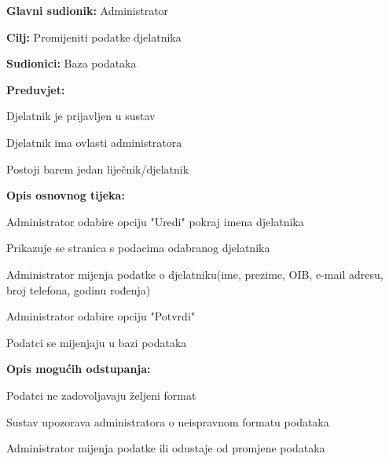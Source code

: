 				\noindent {}
				\begin{packed_item}
					
					\item \textbf{Glavni sudionik: }Administrator
					\item  \textbf{Cilj: }Promijeniti podatke djelatnika
					\item  \textbf{Sudionici: }Baza podataka
					\item  \textbf{Preduvjet: }
					\item[] \begin{packed_enum}
						
						\item[-] Djelatnik je prijavljen u sustav
						\item[-] Djelatnik ima ovlasti administratora
						\item[-] Postoji barem jedan liječnik/djelatnik
					\end{packed_enum}
					\item  \textbf{Opis osnovnog tijeka: }
					
					\item[] \begin{packed_enum}
						\item Administrator odabire opciju "Uredi" pokraj imena djelatnika
						\item Prikazuje se stranica s podacima odabranog djelatnika
						\item Administrator mijenja podatke o djelatniku(ime, prezime, OIB, e-mail adresu, broj telefona, godinu rođenja)
						\item Administrator odabire opciju "Potvrdi"
						\item Podatci se mijenjaju u bazi podataka
					\end{packed_enum}
					
					\item  \textbf{Opis mogućih odstupanja:}
					
					\item[] \begin{packed_item}
						
						\item[3.a] Podatci ne zadovoljavaju željeni format
						\item[] \begin{packed_enum}
							\item Sustav upozorava administratora o neispravnom formatu podataka
							\item Administrator mijenja podatke ili odustaje od promjene podataka							
						\end{packed_enum}
						

\end{packed_item}
\end{packed_item}
